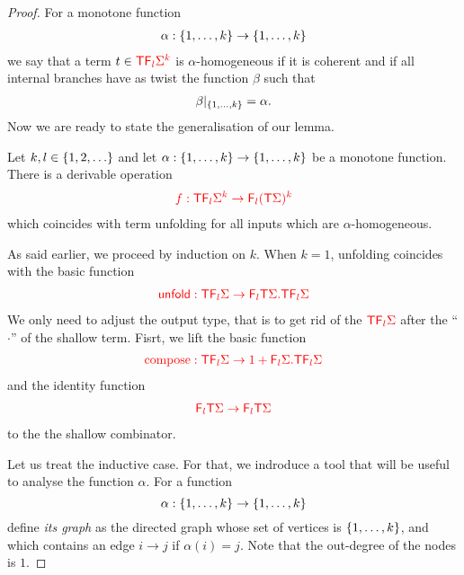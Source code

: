 \begin{proof}
For a monotone function 
\begin{align*}
\alpha: \{1,\ldots,k\} \to \{1,\ldots,k\}
\end{align*}
we say that a term $ t \in{\color{red}{{\color{red}{\mathsf T}}{\color{red}{\mathsf F_{l}}}\Sigma^k}}$ is $\alpha$-homogeneous if  it is coherent and if all internal branches have as twist the function $\beta$ such that
\begin{align*}
\beta|_{\{1,\dots,k\}}=\alpha.
\end{align*}
Now we are ready to state the generalisation of our lemma.
\begin{lemma}
 Let $k, l \in \{1,2,\ldots\}$ and let $\alpha : \{1,\ldots,k\} \to \{1,\ldots,k\}$ be a monotone function. There is a  derivable operation 
    \begin{align*}
        {\color{red}{f : {\color{red}{\mathsf T}}{\color{red}{\mathsf F_{l}}}{\color{red}{\Sigma}}^k \to {\color{red}{\mathsf F_{l}}}({\color{red}{\mathsf T}}\Sigma)^k }}
        \end{align*}      
which coincides with term unfolding for all inputs which are $\alpha$-homogeneous.
\end{lemma}
As said earlier, we proceed by induction on $k$. When $k=1$, unfolding coincides with the basic function
\begin{align*}
{\color{red}{\mathsf{unfold} : {\color{red}{\mathsf T}}{\color{red}{\mathsf F_{l}}}{\color{red}{\Sigma}}\to {\color{red}{{\color{red}{\mathsf F_{l}}}{\color{red}{\mathsf T}}\Sigma . {\color{red}{\mathsf T}}{\color{red}{\mathsf F_{l}}}{\color{red}{\Sigma}}}}  }}
\end{align*}
We only need to adjust the output type, that is to get rid of the ${\color{red}{{\color{red}{\mathsf T}}{\color{red}{\mathsf F_{l}}}{\color{red}{\Sigma}}}}$ after the ``$\cdot$'' of the shallow term. Fisrt, we lift the basic function 
\begin{align*}
{\color{red}{{\color{red}{\mathrm{compose}}}: {\color{red}{\mathsf T}}{\color{red}{\mathsf F_{l}}}{\color{red}{\Sigma}}\to 
        1 + {\color{red}{{\color{red}{\mathsf F_{l}}}{\color{red}{\Sigma}}. {\color{red}{\mathsf T}}{\color{red}{\mathsf F_{l}}}{\color{red}{\Sigma}}}}}}          
\end{align*} 
and the identity function 
\begin{align*}
{\color{red}{ {\color{red}{\mathsf F_{l}}}{\color{red}{\mathsf T}}\Sigma\to {\color{red}{\mathsf F_{l}}}{\color{red}{\mathsf T}}\Sigma}}          
\end{align*} 
to the the shallow combinator. 

Let us treat the inductive case. For that, we indroduce a tool that will be useful to analyse the function $\alpha$. For a function $$\alpha: \{1,\ldots,k\} \to \{1,\ldots,k\}$$ define  \emph{its graph} as the directed graph whose set of vertices is $\{1,\ldots,k\}$, and which contains an edge $i\rightarrow j$ if $\alpha(i)=j$. Note that the out-degree of the nodes is $1.$


\end{proof}
